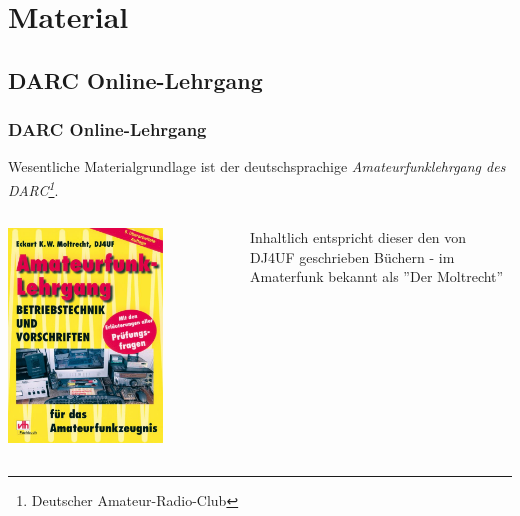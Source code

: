 \section{Material}

\subsection[DARC-Lehrgang]{DARC Online-Lehrgang}

\begin{frame}
    \frametitle{DARC Online-Lehrgang}

    Wesentliche Materialgrundlage ist der deutschsprachige
    \emph{Amateurfunklehrgang\hyperlink{refs}{\cite{darc}} des
    DARC\footnote{Deutscher Amateur-Radio-Club}}.

    \begin{columns}[c]
        \column[c]{5cm}
        \begin{center}
            \includegraphics[width=0.7\textwidth]{e00/Amateurfunklehrgang-Betriebstechnik-und-Vorschriften.jpg}
            \tiny \hyperlink{refs}{\cite{darcv}}
        \end{center}
        \column{5cm}
            Inhaltlich entspricht dieser den von DJ4UF geschrieben Büchern - im
            Amaterfunk bekannt als ''Der Moltrecht''\hyperlink{refs}{\cite{dj4uf}}
    \end{columns}

\end{frame}


